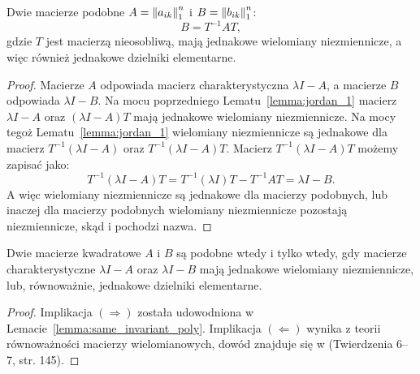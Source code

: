 \begin{lemma}\label{lemma:same_invariant_poly}
    Dwie macierze podobne $A = \left\| a_{ik} \right\|_{1}^{n}$ i $B = \left\| b_{ik} \right\|_{1}^{n}$:
    $$B = T^{-1}AT,$$
    gdzie $T$ jest macierzą nieosobliwą, mają jednakowe wielomiany niezmiennicze, a więc również jednakowe dzielniki elementarne.
\end{lemma}
\begin{proof}
Macierze $A$ odpowiada macierz charakterystyczna $\lambda I - A$, a macierze $B$ odpowiada $\lambda I - B$.
Na mocu poprzedniego Lematu~\ref{lemma:jordan_1} macierz $\lambda I - A$ oraz $(\lambda I - A)T$ mają jednakowe wielomiany niezmiennicze. Na mocy tegoż Lematu~\ref{lemma:jordan_1} wielomiany niezmiennicze są jednakowe dla macierz $T^{-1}(\lambda I - A)$ oraz $T^{-1}(\lambda I - A)T$. Macierz $T^{-1}(\lambda I - A)T$ możemy zapisać jako:
$$ T^{-1}(\lambda I - A)T = T^{-1}(\lambda I)T - T^{-1}AT = \lambda I - B.$$
A więc wielomiany niezmiennicze są jednakowe dla macierzy podobnych, lub inaczej dla macierzy podobnych wielomiany niezmiennicze pozostają niezmiennicze, skąd i pochodzi nazwa. 
\end{proof}

\begin{theorem}[Gantmacher]\label{theorem:gantmacher_similarity}
    Dwie macierze kwadratowe $A$ i $B$ są podobne wtedy i tylko wtedy, gdy macierze charakterystyczne $\lambda I - A$ oraz $\lambda I - B$ mają jednakowe wielomiany niezmiennicze, lub, równoważnie, jednakowe dzielniki elementarne.
\end{theorem}
\begin{proof}
    Implikacja $(\Rightarrow)$ została udowodniona w Lemacie~\ref{lemma:same_invariant_poly}. Implikacja $(\Leftarrow)$ wynika z teorii równoważności macierzy wielomianowych, dowód znajduje się w \cite[Rozdział VI]{gantmacher2000} (Twierdzenia 6--7, str. 145).
\end{proof}
